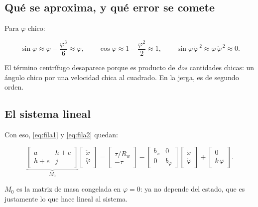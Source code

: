 \documentclass[11pt,a4paper]{report}
\begin{document}
\subsection{Qué se aproxima, y qué error se comete}

Para $\varphi$ chico:

\begin{equation}
\sin\varphi \approx \varphi - \frac{\varphi^3}{6} \approx \varphi,
\qquad
\cos\varphi \approx 1 - \frac{\varphi^2}{2} \approx 1,
\qquad
\sin\varphi\,\dot\varphi^{\,2} \approx \varphi\,\dot\varphi^{\,2} \approx 0 .
\end{equation}

El término centrífugo desaparece porque es producto de \emph{dos} cantidades chicas: un
ángulo chico por una velocidad chica al cuadrado. En la jerga, es de segundo orden.

\subsection{El sistema lineal}

Con eso, \eqref{eq:fila1} y \eqref{eq:fila2} quedan:

\begin{equation}\label{eq:lineal}
\underbrace{\begin{bmatrix} a & h+e \\ h+e & j \end{bmatrix}}_{M_0}
\begin{bmatrix} \ddot x \\ \ddot\varphi \end{bmatrix}
=
\begin{bmatrix} \tau/R_w \\ -\tau \end{bmatrix}
-
\begin{bmatrix} b_x & 0 \\ 0 & b_\varphi \end{bmatrix}
\begin{bmatrix} \dot x \\ \dot\varphi \end{bmatrix}
+
\begin{bmatrix} 0 \\ k\,\varphi \end{bmatrix}.
\end{equation}

$M_0$ es la matriz de masa congelada en $\varphi = 0$: ya no depende del estado, que es
justamente lo que hace lineal al sistema.
\end{document}
